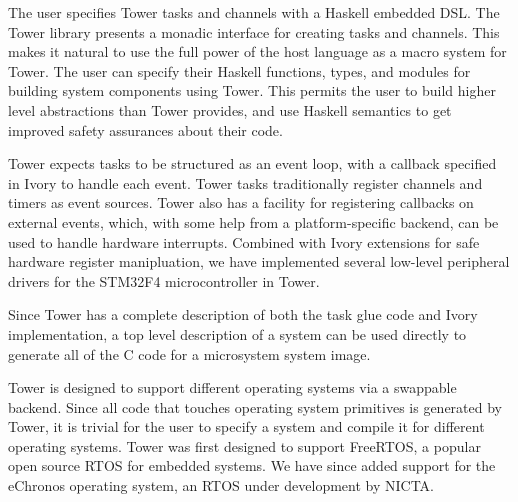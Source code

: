 The user specifies Tower tasks and channels with a Haskell embedded DSL. The
Tower library presents a monadic interface for creating tasks and channels.
This makes it natural to use the full power of the host language as a macro
system for Tower. The user can specify their Haskell functions, types, and
modules for building system components using Tower. This permits the user to
build higher level abstractions than Tower provides, and use Haskell semantics
to get improved safety assurances about their code.

Tower expects tasks to be structured as an event loop, with a callback specified
in Ivory to handle each event. Tower tasks traditionally register channels and
timers as event sources. Tower also has a facility for registering callbacks on
external events, which, with some help from a platform-specific backend, can
be used to handle hardware interrupts. Combined with Ivory extensions for safe
hardware register manipluation, we have implemented several low-level peripheral
drivers for the STM32F4 microcontroller in Tower.

Since Tower has a complete description of both the task glue code and Ivory
implementation, a top level description of a system can be used directly to
generate all of the C code for a microsystem system image.

Tower is designed to support different operating systems via a swappable
backend. Since all code that touches operating system primitives is generated by
Tower, it is trivial for the user to specify a system and compile it for
different operating systems. Tower was first designed to support FreeRTOS, a
popular open source RTOS for embedded systems. We have since added support for
the eChronos operating system, an RTOS under development by NICTA.
